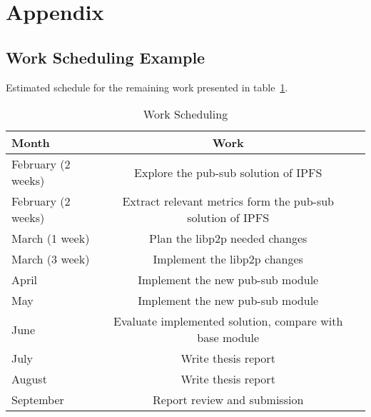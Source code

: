 
\section{Appendix} %
\label{sec:attachments}

\subsection{Work Scheduling Example} %
\label{sub:work_scheduling}
Estimated schedule for the remaining work presented in table~\ref{tab:worktable}.
\begin{table}[H]
  \caption{Work Scheduling}
  \label{tab:worktable}
  \begin{center}
    \begin{tabular}{l|cc}
    \hline

    \hline
    \textbf{Month} & \textbf{Work} \\
    \hline
      February (2 weeks) & Explore the pub-sub solution of IPFS \\
    \hline
      February (2 weeks) & Extract relevant metrics form the pub-sub solution of IPFS \\
    \hline
      March (1 week) & Plan the libp2p needed changes \\
    \hline
      March (3 week) & Implement the libp2p changes \\
    \hline
      April & Implement the new pub-sub module \\
    \hline
      May & Implement the new pub-sub module \\
    \hline
      June & Evaluate implemented solution, compare with base module \\
    \hline
      July & Write thesis report   \\
    \hline
      August & Write thesis report   \\
    \hline
      September & Report review and submission   \\
    \hline

    \hline
    \end{tabular}
  \end{center}
\end{table}
